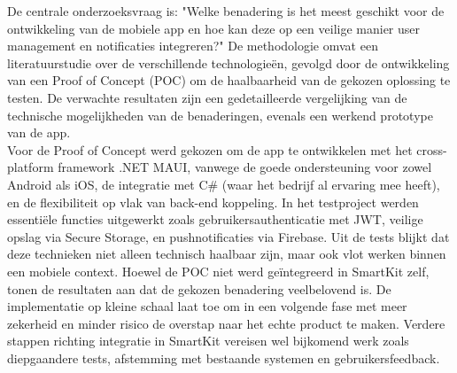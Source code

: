 De centrale onderzoeksvraag is: "Welke benadering is het meest geschikt voor de ontwikkeling van de mobiele app en hoe kan deze op een veilige manier user management en notificaties integreren?" De methodologie omvat een literatuurstudie over de verschillende technologieën, gevolgd door de ontwikkeling van een Proof of Concept (POC) om de haalbaarheid van de gekozen oplossing te testen. De verwachte resultaten zijn een gedetailleerde vergelijking van de technische mogelijkheden van de benaderingen, evenals een werkend prototype van de app. \\

Voor de Proof of Concept werd gekozen om de app te ontwikkelen met het cross-platform framework .NET MAUI, vanwege de goede ondersteuning voor zowel Android als iOS, de integratie met C# (waar het bedrijf al ervaring mee heeft), en de flexibiliteit op vlak van back-end koppeling. In het testproject werden essentiële functies uitgewerkt zoals gebruikersauthenticatie met JWT, veilige opslag via Secure Storage, en pushnotificaties via Firebase. Uit de tests blijkt dat deze technieken niet alleen technisch haalbaar zijn, maar ook vlot werken binnen een mobiele context. Hoewel de POC niet werd geïntegreerd in SmartKit zelf, tonen de resultaten aan dat de gekozen benadering veelbelovend is. De implementatie op kleine schaal laat toe om in een volgende fase met meer zekerheid en minder risico de overstap naar het echte product te maken. Verdere stappen richting integratie in SmartKit vereisen wel bijkomend werk zoals diepgaandere tests, afstemming met bestaande systemen en gebruikersfeedback.
